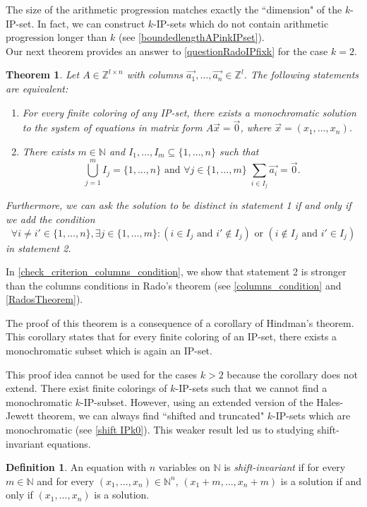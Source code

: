 \documentclass{article}
\theoremstyle{definition}
\newtheorem{definition}{Definition}[section]
\theoremstyle{plain}
\newtheorem{maintheorem}{Theorem}
\theoremstyle{remark}
\newcommand{\N}{\ensuremath{\mathbb{N}}}
\newcommand{\Z}{\ensuremath{\mathbb{Z}}}
\begin{document}
The size of the arithmetic progression matches exactly the “dimension" of the $k$-IP-set. In fact, we can construct $k$-IP-sets which do not contain arithmetic progression longer than $k$ (see \cref{boundedlengthAPinkIPset}).\\

Our next theorem provides an answer to \cref{questionRadoIPfixk} for the case $k=2$.
\begin{maintheorem}\label{INTRO_classification_regular_systems_IP}
    Let $A \in \Z^{l\times n}$ with columns $\Vec{a_1}, \ldots, \Vec{a_n} \in \Z^l$. The following statements are equivalent:
    \begin{enumerate}
        \item For every finite coloring of any IP-set, there exists a monochromatic solution to the system of equations in matrix form $A\Vec{x} = \Vec{0}$, where $\Vec{x}= (x_1,\ldots,x_n)$.
        \item There exists $m\in \N$ and $I_1, \ldots, I_m \subseteq \{1,\ldots,n\}$ such that 
        $$\bigcup_{j=1}^m I_j = \{1,\ldots,n\} \text{ and } \forall j \in \{1,\ldots,m\} \; \sum_{i \in I_j} \Vec{a_i} = \Vec{0}.$$
    \end{enumerate}

    Furthermore, we can ask the solution to be distinct in statement 1 if and only if we add the condition
    $$\forall i \neq i' \in \{1,\ldots,n\}, \exists j \in \{1,\ldots,m\} : (i \in I_j\text{ and } i' \notin I_j) \text{ or } (i \notin I_j\text{ and } i' \in I_j)$$
    in statement 2.
\end{maintheorem}
In \cref{check_criterion_columns_condition}, we show that statement 2 is stronger than the columns conditions in Rado's theorem (see \cref{columns_condition} and \cref{RadosTheorem}).

The proof of this theorem is a consequence of a corollary of Hindman's theorem. This corollary states that for every finite coloring of an IP-set, there exists a monochromatic subset which is again an IP-set.

This proof idea cannot be used for the cases $k>2$ because the corollary does not extend. There exist finite colorings of $k$-IP-sets such that we cannot find a monochromatic $k$-IP-subset. However, using an extended version of the Hales-Jewett theorem, we can always find “shifted and truncated" $k$-IP-sets which are monochromatic (see \cref{shift IPk0}). This weaker result led us to studying shift-invariant equations.

\begin{definition}
    An equation with $n$ variables on $\N$ is \textit{shift-invariant} if for every $m \in \N$ and for every $(x_1, \ldots, x_n)\in \N^n$,
    $(x_1 + m, \ldots, x_n + m)$ is a solution if and only if $(x_1, \ldots, x_n)$ is a solution.
\end{definition}
\end{document}

